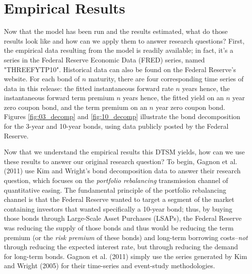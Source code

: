 \documentclass[12pt,final]{article}
\begin{document}
\section{Empirical Results}
Now that the model has been run and the results estimated, what do those results look like and how can we apply them to answer research questions? First, the empirical data resulting from the model is readily available; in fact, it's a series in the Federal Reserve Economic Data (FRED) series, named "THREEFYTP10". \citep{fred_10} Historical data can also be found on the Federal Reserve's website. For each bond of $n$ maturity, there are four corresponding time series of data in this release: the fitted instantaneous forward rate $n$ years hence, the instantaneous forward term premium $n$ years hence, the fitted yield on an $n$ year zero coupon bond, and the term premium on an $n$ year zero coupon bond. Figures \ref{fig:03_decomp} and \ref{fig:10_decomp} illustrate the bond decomposition for the 3-year and 10-year bonds, using data publicly posted by the Federal Reserve. 

Now that we understand the empirical results this DTSM yields, how can we use these results to answer our original research question? To begin, Gagnon et al. (2011) use Kim and Wright's bond decomposition data to answer their research question, which focuses on the \textit{portfolio rebalancing} transmission channel of quantitative easing. The fundamental principle of the portfolio rebalancing channel is that the Federal Reserve wanted to target a segment of the market containing investors that wanted specifically a 10-year bond; thus, by buying those bonds through Large-Scale Asset Purchases (LSAPs), the Federal Reserve was reducing the supply of those bonds and thus would be reducing the term premium (or the \textit{risk premium} of these bonds) and long-term borrowing costs--\textit{not} through reducing the expected interest rate, but through reducing the demand for long-term bonds. \citep{Gagnon2011} Gagnon et al. (2011) simply use the series generated by Kim and Wright (2005) for their time-series and event-study methodologies.
\end{document}
